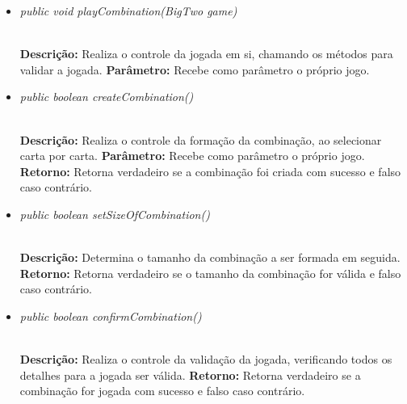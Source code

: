 \documentclass[12pt]{article}
\begin{document}
\vspace{0.2 true cm}

\begin{itemize}
\item \begin{large}\textit{public void playCombination(BigTwo game)}\end{large}\\
\subitem \textbf{Descrição:} Realiza o controle da jogada em si, chamando os métodos para validar a jogada.
\subitem \textbf{Parâmetro:} Recebe como parâmetro o próprio jogo.
\end{itemize}

\vspace{0.2 true cm}

\begin{itemize}
\item \begin{large}\textit{public boolean createCombination()}\end{large}\\
\subitem \textbf{Descrição:} Realiza o controle da formação da combinação, ao selecionar carta por carta.
\subitem \textbf{Parâmetro:} Recebe como parâmetro o próprio jogo.
\subitem \textbf{Retorno:} Retorna verdadeiro se a combinação foi criada com sucesso e falso caso contrário.
\end{itemize}

\vspace{0.2 true cm}

\begin{itemize}
\item \begin{large}\textit{public boolean setSizeOfCombination()}\end{large}\\
\subitem \textbf{Descrição:} Determina o tamanho da combinação a ser formada em seguida.
\subitem \textbf{Retorno:} Retorna verdadeiro se o tamanho da combinação for válida e falso caso contrário.
\end{itemize}

\vspace{0.2 true cm}

\begin{itemize}
\item \begin{large}\textit{public boolean confirmCombination()}\end{large}\\
\subitem \textbf{Descrição:} Realiza o controle da validação da jogada, verificando todos os detalhes para a jogada ser válida.
\subitem \textbf{Retorno:} Retorna verdadeiro se a combinação for jogada com sucesso e falso caso contrário.
\end{itemize}
\end{document}
